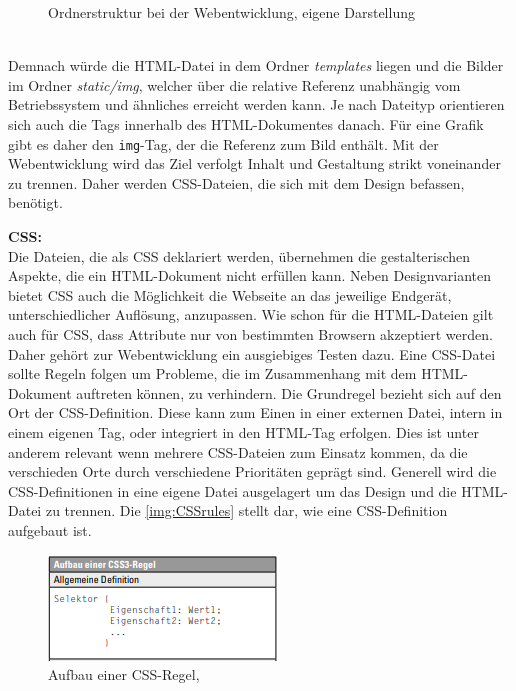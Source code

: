 \documentclass[a4paper,titlepage,halfparskip,12pt]{scrreprt}
\begin{document}
\begin{onehalfspacing}
\begin{figure}[h]
	\caption{Ordnerstruktur bei der Webentwicklung, eigene Darstellung} 
	\label{img:TreeHTMLStruktur}
\end{figure}
\\Demnach würde die \ac{HTML}-Datei in dem Ordner \textit{templates} liegen und die Bilder im Ordner \textit{static/img}, welcher über die relative Referenz unabhängig vom Betriebssystem und ähnliches erreicht werden kann. Je nach Dateityp orientieren sich auch die Tags innerhalb des \ac{HTML}-Dokumentes danach. Für eine Grafik gibt es daher den \texttt{img}-Tag, der die Referenz zum Bild enthält. Mit der Webentwicklung wird das Ziel verfolgt Inhalt und Gestaltung strikt voneinander zu trennen. Daher werden \ac{CSS}-Dateien, die sich mit dem Design befassen, benötigt.

\textbf{CSS:}\\
Die Dateien, die als \ac{CSS} deklariert werden, übernehmen die gestalterischen Aspekte, die ein \ac{HTML}-Dokument nicht erfüllen kann. Neben Designvarianten bietet \ac{CSS} auch die Möglichkeit die Webseite an das jeweilige Endgerät, unterschiedlicher Auflösung, anzupassen. Wie schon für die \ac{HTML}-Dateien gilt auch für \ac{CSS}, dass Attribute nur von bestimmten Browsern akzeptiert werden. Daher gehört zur Webentwicklung ein ausgiebiges Testen dazu. Eine \ac{CSS}-Datei sollte Regeln folgen um Probleme, die im Zusammenhang mit dem HTML-Dokument auftreten können, zu verhindern. Die Grundregel bezieht sich auf den Ort der \ac{CSS}-Definition. Diese kann zum Einen in einer externen Datei, intern in einem eigenen Tag, oder integriert in den \ac{HTML}-Tag erfolgen. Dies ist unter anderem relevant wenn mehrere \ac{CSS}-Dateien zum Einsatz kommen, da die verschieden Orte durch verschiedene Prioritäten geprägt sind. Generell wird die \ac{CSS}-Definitionen in eine eigene Datei ausgelagert um das Design und die \ac{HTML}-Datei zu trennen. Die \autoref{img:CSSrules} stellt dar, wie eine \ac{CSS}-Definition aufgebaut ist.
\begin{figure}[h]
	\centering
	\includegraphics[scale=2.5]{images/CSS_Definition}
	\caption{Aufbau einer \ac{CSS}-Regel, \cite{buhler2017html5}}
	\label{img:CSSrules}
\end{figure}	

\end{onehalfspacing}
\end{document}
